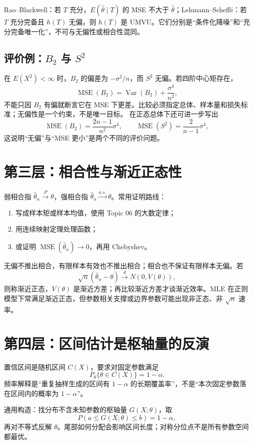 \documentclass[11pt,a4paper]{ctexart}
\begin{document}
Rao--Blackwell：若 $T$ 充分，$E(\widehat\theta\mid T)$ 的 MSE 不大于 $\widehat\theta$；Lehmann--Scheffé：若 $T$ 充分完备且 $h(T)$ 无偏，则 $h(T)$ 是 UMVU。它们分别是“条件化降噪”和“充分完备唯一化”，不可与无偏性或相合性混同。

\subsection{评价例：$B_2$ 与 $S^2$}

在 $E(X^2)<\infty$ 时，$B_2$ 的偏差为 $-\sigma^2/n$，而 $S^2$ 无偏。若四阶中心矩存在，
\[
\operatorname{MSE}(B_2)=\operatorname{Var}(B_2)+\frac{\sigma^4}{n^2},
\]
不能只因 $B_2$ 有偏就断言它在 MSE 下更差。比较必须指定总体、样本量和损失标准；无偏性是一个约束，不是唯一目标。
在正态总体下还可进一步写出
\[
\operatorname{MSE}(B_2)=\frac{2n-1}{n^2}\sigma^4,
\qquad
\operatorname{MSE}(S^2)=\frac{2}{n-1}\sigma^4,
\]
这说明“无偏”与“MSE 更小”是两个不同的评价问题。

\section{第三层：相合性与渐近正态性}

弱相合指 $\widehat\theta_n\xrightarrow{P}\theta$，强相合指 $\widehat\theta_n\xrightarrow{a.s.}\theta$。常用证明路线：
\begin{enumerate}
  \item 写成样本矩或样本均值，使用 Topic 06 的大数定律；
  \item 用连续映射定理处理函数；
  \item 或证明 $\operatorname{MSE}(\widehat\theta_n)\to0$，再用 Chebyshev。
\end{enumerate}
无偏不推出相合，有限样本有效也不推出相合；相合也不保证有限样本无偏。若
\[
\sqrt n(\widehat\theta_n-\theta)\xrightarrow{d}N(0,V(\theta)),
\]
则称渐近正态，$V(\theta)$ 是渐近方差；再比较渐近方差才谈渐近效率。MLE 在正则模型下常满足渐近正态，但参数相关支撑或边界参数可能出现非正态、非 $\sqrt n$ 速率。

\section{第四层：区间估计是枢轴量的反演}

置信区间是随机区间 $C(X)$，要求对固定参数满足
\[
P_\theta\{\theta\in C(X)\}=1-\alpha.
\]
频率解释是“重复抽样生成的区间有 $1-\alpha$ 的长期覆盖率”，不是“本次固定参数落在区间内的概率为 $1-\alpha$”。

通用构造：找分布不含未知参数的枢轴量 $G(X;\theta)$，取
\[
P(a\leq G(X;\theta)\leq b)=1-\alpha,
\]
再对不等式反解 $\theta$。尾部如何分配会影响区间长度；对称分位点不是所有参数空间都最优。
\end{document}
